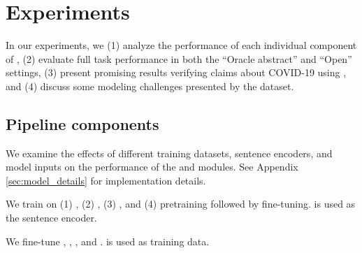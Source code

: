\section{Experiments}

In our experiments, we (1) analyze the performance of each individual component of \sysname, (2) evaluate full task performance in both the ``Oracle abstract'' and ``Open'' settings, (3) present promising results verifying claims about COVID-19 using \sysname, and (4) discuss some modeling challenges presented by the dataset.





\subsection{Pipeline components} \label{sec:pipeline_components}
We examine the effects of different training datasets, sentence encoders, and model inputs on the performance of the \componenttwo and \componentthree modules. See Appendix \ref{sec:model_details} for implementation details.



\vspace{.2cm} 
We train on (1) \fever, (2) \snopes, (3) \ours, and (4) \fever pretraining followed by \ours fine-tuning. \robertalarge \cite{Liu2019RoBERTaAR} is used as the sentence encoder.

\vspace{.2cm} 
We fine-tune \scibert \cite{Beltagy2019SciBERTPC}, \bioroberta \cite{Gururangan2020DONTST}, \robertabase, and \robertalarge. \ours is used as training data.

